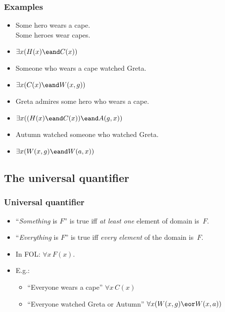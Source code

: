 \begin{frame}
\frametitle{Examples}

\begin{itemize}[<+->]
  \item \alert{Some hero} wears a cape.\\
  \alert{Some heroes} wear capes.\\
  \item[] \alert{$\exists x(H(x) \eand C(x))$}
  \item \alert{Someone who wears a cape} watched Greta.\\
  \item[] \alert{$\exists x(C(x) \eand W(x,g))$}
  \item Greta admires \alert{some hero who wears a cape}.
  \item[] \alert{$\exists x((H(x) \eand C(x)) \eand A(g,x))$}
  \item Autumn watched \alert{someone who watched Greta}.
  \item[] \alert{$\exists x(W(x,g) \eand W(a,x))$}
\end{itemize}
\end{frame}

\newhourlecture

\subsection{The universal quantifier}

\begin{frame}
\frametitle{Universal quantifier}

\begin{itemize}[<+->]
  \item ``\emph{Something} is $F$'' is true iff \emph{at least one} element of domain
  is~$F$.
  \item ``\emph{Everything} is $F$'' is true iff \emph{every element} of the domain
  is~$F$.
  \item In FOL: $\forall x\, F(x)$.
  \item E.g.:
    \begin{itemize}
      \item ``Everyone wears a cape'' \alert{$\forall x\,C(x)$}
      \item ``Everyone watched Greta or Autumn'' \alert{$\forall
      x(W(x,g) \eor W(x,a))$}
    \end{itemize}
\end{itemize}
\end{frame}

